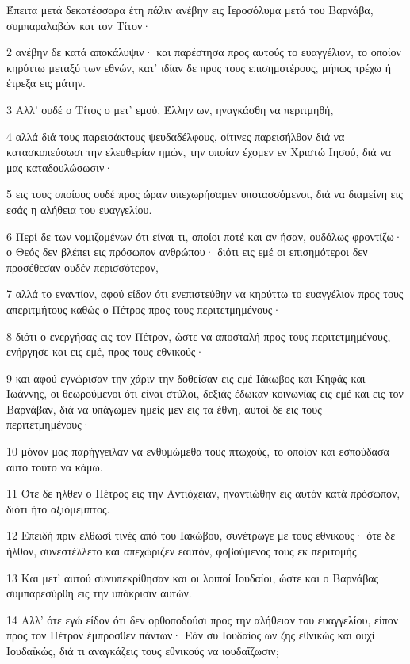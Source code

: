 \par Έπειτα μετά δεκατέσσαρα έτη πάλιν ανέβην εις Ιεροσόλυμα μετά του Βαρνάβα, συμπαραλαβών και τον Τίτον·
\par 2 ανέβην δε κατά αποκάλυψιν· και παρέστησα προς αυτούς το ευαγγέλιον, το οποίον κηρύττω μεταξύ των εθνών, κατ' ιδίαν δε προς τους επισημοτέρους, μήπως τρέχω ή έτρεξα εις μάτην.
\par 3 Αλλ' ουδέ ο Τίτος ο μετ' εμού, Έλλην ων, ηναγκάσθη να περιτμηθή,
\par 4 αλλά διά τους παρεισάκτους ψευδαδέλφους, οίτινες παρεισήλθον διά να κατασκοπεύσωσι την ελευθερίαν ημών, την οποίαν έχομεν εν Χριστώ Ιησού, διά να μας καταδουλώσωσιν·
\par 5 εις τους οποίους ουδέ προς ώραν υπεχωρήσαμεν υποτασσόμενοι, διά να διαμείνη εις εσάς η αλήθεια του ευαγγελίου.
\par 6 Περί δε των νομιζομένων ότι είναι τι, οποίοι ποτέ και αν ήσαν, ουδόλως φροντίζω· ο Θεός δεν βλέπει εις πρόσωπον ανθρώπου· διότι εις εμέ οι επισημότεροι δεν προσέθεσαν ουδέν περισσότερον,
\par 7 αλλά το εναντίον, αφού είδον ότι ενεπιστεύθην να κηρύττω το ευαγγέλιον προς τους απεριτμήτους καθώς ο Πέτρος προς τους περιτετμημένους·
\par 8 διότι ο ενεργήσας εις τον Πέτρον, ώστε να αποσταλή προς τους περιτετμημένους, ενήργησε και εις εμέ, προς τους εθνικούς·
\par 9 και αφού εγνώρισαν την χάριν την δοθείσαν εις εμέ Ιάκωβος και Κηφάς και Ιωάννης, οι θεωρούμενοι ότι είναι στύλοι, δεξιάς έδωκαν κοινωνίας εις εμέ και εις τον Βαρνάβαν, διά να υπάγωμεν ημείς μεν εις τα έθνη, αυτοί δε εις τους περιτετμημένους·
\par 10 μόνον μας παρήγγειλαν να ενθυμώμεθα τους πτωχούς, το οποίον και εσπούδασα αυτό τούτο να κάμω.
\par 11 Ότε δε ήλθεν ο Πέτρος εις την Αντιόχειαν, ηναντιώθην εις αυτόν κατά πρόσωπον, διότι ήτο αξιόμεμπτος.
\par 12 Επειδή πριν έλθωσί τινές από του Ιακώβου, συνέτρωγε με τους εθνικούς· ότε δε ήλθον, συνεστέλλετο και απεχώριζεν εαυτόν, φοβούμενος τους εκ περιτομής.
\par 13 Και μετ' αυτού συνυπεκρίθησαν και οι λοιποί Ιουδαίοι, ώστε και ο Βαρνάβας συμπαρεσύρθη εις την υπόκρισιν αυτών.
\par 14 Αλλ' ότε εγώ είδον ότι δεν ορθοποδούσι προς την αλήθειαν του ευαγγελίου, είπον προς τον Πέτρον έμπροσθεν πάντων· Εάν συ Ιουδαίος ων ζης εθνικώς και ουχί Ιουδαϊκώς, διά τι αναγκάζεις τους εθνικούς να ιουδαΐζωσιν;
